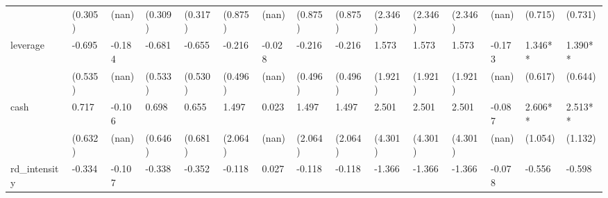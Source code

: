 \begin{table}
\begin{center}
\begin{tabular}{lllllllllllllll}
                  & (0.305)            & (nan)              & (0.309)                & (0.317)             & (0.875)              & (nan)                & (0.875)                  & (0.875)               & (2.346)              & (2.346)                  & (2.346)               & (nan)                         & (0.715)                                   & (0.731)                                 \\
leverage          & -0.695             & -0.184             & -0.681                 & -0.655              & -0.216               & -0.028               & -0.216                   & -0.216                & 1.573                & 1.573                    & 1.573                 & -0.173                        & 1.346**                                   & 1.390**                                 \\
                  & (0.535)            & (nan)              & (0.533)                & (0.530)             & (0.496)              & (nan)                & (0.496)                  & (0.496)               & (1.921)              & (1.921)                  & (1.921)               & (nan)                         & (0.617)                                   & (0.644)                                 \\
cash              & 0.717              & -0.106             & 0.698                  & 0.655               & 1.497                & 0.023                & 1.497                    & 1.497                 & 2.501                & 2.501                    & 2.501                 & -0.087                        & 2.606**                                   & 2.513**                                 \\
                  & (0.632)            & (nan)              & (0.646)                & (0.681)             & (2.064)              & (nan)                & (2.064)                  & (2.064)               & (4.301)              & (4.301)                  & (4.301)               & (nan)                         & (1.054)                                   & (1.132)                                 \\
rd\_intensity     & -0.334             & -0.107             & -0.338                 & -0.352              & -0.118               & 0.027                & -0.118                   & -0.118                & -1.366               & -1.366                   & -1.366                & -0.078                        & -0.556                                    & -0.598                                  \\

\end{tabular}
\end{center}
\end{table}
